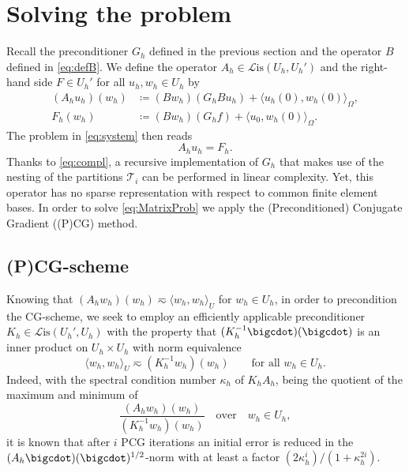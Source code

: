 \documentclass{amsart}
\providecommand{\tria}{\mathcal{T}}
\newcommand{\cL}{\mathcal L}
\newcommand{\Lis}{\cL\mathrm{is}}
\begin{document}
\section{Solving the problem}\label{sec:SolvProb}
Recall the preconditioner $G_h$ defined in the previous section and the operator $B$ defined in \eqref{eq:defB}. We define the operator $A_h\in \Lis(U_h,U_h')$ and the right-hand side $F \in U_h'$ for all  $u_h, w_h \in U_h$ by
\begin{equation*}
\begin{aligned}
(A_h u_h) (w_h) &\coloneqq (Bw_h) (G_h B u_h) + \langle u_h(0),w_h(0)\rangle_\Omega,\\
F_{h}(w_h) &\coloneqq  (Bw_h) (G_h f) + \langle u_0,w_h(0)\rangle_\Omega. 
\end{aligned}
\end{equation*}
The problem in \eqref{eq:system} then reads
\begin{equation}\label{eq:MatrixProb}
A_h u_h = F_h.
\end{equation}  
Thanks to \eqref{eq:compl}, a recursive implementation of $G_h$ that makes use of the nesting of the partitions $\tria_i$ can be performed in linear complexity. Yet, this operator has no sparse representation with respect to common finite element bases.
In order to solve \eqref{eq:MatrixProb} we apply the (Preconditioned) Conjugate Gradient ((P)CG) method.
%
\subsection{(P)CG-scheme}\label{subsec:PCGscheme}
Knowing that $(A_h w_h)(w_h) \eqsim \langle w_h , w_h \rangle_U$ for $w_h \in U_h$, in order to precondition the CG-scheme, we seek to employ an efficiently applicable preconditioner $K_h\in \Lis(U_h',U_h)$ with the property that $(K_h^{-1} \bigcdot)(\bigcdot)$ is an inner product on $U_h \times U_h$ with norm equivalence
\begin{equation}\label{eq:EquiKh}
\langle w_h , w_h \rangle_U \eqsim (K_h^{-1}w_h)(w_h) \qquad\text{for all }w_h \in U_h. 
\end{equation} 
%
Indeed, with the spectral condition number $\kappa_h$ of $K_h A_h$, being the quotient of the maximum and minimum of 
\begin{equation*}
\frac{(A_h w_h)(w_h)}{(K_h^{-1} w_h)(w_h)}\quad \text{over}\quad w_h \in U_h,
\end{equation*}
it is known that after $i$ PCG iterations an initial error is reduced in the $(A_h \bigcdot)(\bigcdot)^{1/2}$-norm with at least a factor $(2 \kappa_h^i)/(1+\kappa_h^{2i})$.
\end{document}
